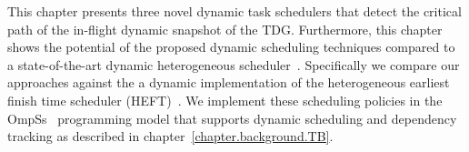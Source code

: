 

This chapter presents three novel dynamic task schedulers that detect the critical path of the in-flight dynamic snapshot of the TDG. 
Furthermore, this chapter shows the potential of the proposed dynamic scheduling techniques compared to a state-of-the-art dynamic heterogeneous scheduler~\cite{HEFT}.
Specifically we compare our approaches against the a dynamic implementation of the heterogeneous earliest finish time scheduler (HEFT)~\cite{HEFT}.
We implement these scheduling policies in the OmpSs~\cite{OmpSs_PPL11,OmpSs} programming model that supports dynamic scheduling and dependency tracking as described in chapter~\ref{chapter.background.TB}.



